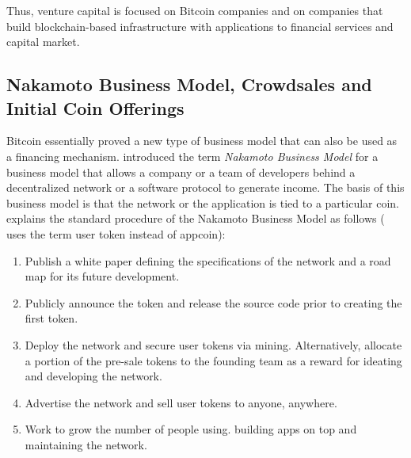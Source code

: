 Thus, venture capital is focused on Bitcoin companies and on companies that build blockchain-based infrastructure with applications to financial services and capital market.


\subsection{Nakamoto Business Model, Crowdsales and Initial Coin Offerings}
\label{sec:eco:crowdsale}

Bitcoin essentially proved a new type of business model that can also be used as a financing mechanism. \cite{Brener2016} introduced the term \emph{Nakamoto Business Model} for a business model that allows a company or a team of developers behind a decentralized network or a software protocol to generate income. The basis of this business model is that the network or the application is tied to a particular coin. \cite{Brener2016} explains the standard procedure of the Nakamoto Business Model as follows (\cite{Brener2016} uses the term user token instead of appcoin):
\begin{enumerate}
	\item Publish a white paper defining the specifications of the network and a road map for its future development.
	\item Publicly announce the token and release the source code prior to creating the first token.
	\item Deploy the network and secure user tokens via mining. Alternatively, allocate a portion of the pre-sale tokens to the founding team as a reward for ideating and developing the network.
	\item Advertise the network and sell user tokens to anyone, anywhere.
	\item Work to grow the number of people using. building apps on top and maintaining the network.
\end{enumerate}

